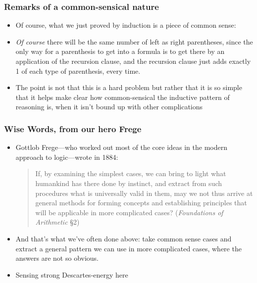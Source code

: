 \begin{frame}
\frametitle{Remarks of a common-sensical nature}

\begin{itemize}[<+->]
\item Of course, what we just proved by induction is a piece of common sense:

\item {\it{Of course}} there will be the same number of left as right parentheses, since the only way for a parenthesis to get into a formula is to get there by an application of the recursion clause, and the recursion clause just adds exactly 1 of each type of parenthesis, every time.

\item The point is not that this is a hard problem but rather that it is so simple that it helps make clear how common-sensical the inductive pattern of reasoning is, when it isn't bound up with other complications

\end{itemize} 
\end{frame}


\begin{frame}
\frametitle{Wise Words, from our hero Frege}

\begin{itemize}[<+->]
\item Gottlob Frege---who worked out most of the core ideas in the modern approach to logic---wrote in 1884:

\begin{quote} 
If, by examining the simplest cases, we can bring to light what humankind has there done by instinct, and extract from such procedures what is universally valid in them, may we not thus arrive at general methods for forming concepts and establishing principles that will be applicable in more complicated cases? ({\it{Foundations of Arithmetic}} \S2)
\end{quote}

\item And that's what we've often done above: take common sense cases and extract a general pattern we can use in more complicated cases, where the answers are not so obvious.

\item Sensing strong Descartes-energy here 

\end{itemize} 
\end{frame}


